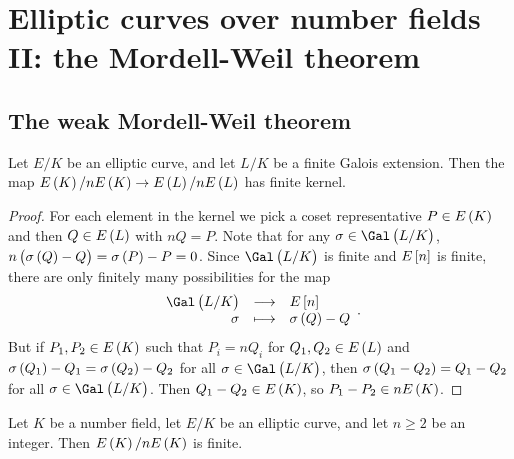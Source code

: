 \pagebreak

\section{Elliptic curves over number fields II: the Mordell-Weil theorem}

\subsection{The weak Mordell-Weil theorem}

\begin{lemma}
\label{lem:12.1}
Let $ E / K $ be an elliptic curve, and let $ L / K $ be a finite Galois extension. Then the map $ E\br{K} / nE\br{K} \to E\br{L} / nE\br{L} $ has finite kernel.
\end{lemma}

\begin{proof}
For each element in the kernel we pick a coset representative $ P \in E\br{K} $ and then $ Q \in E\br{L} $ with $ nQ = P $. Note that for any $ \sigma \in \Gal\br{L / K} $, $ n\br{\sigma\br{Q} - Q} = \sigma\br{P} - P = 0 $. Since $ \Gal\br{L / K} $ is finite and $ E\sbr{n} $ is finite, there are only finitely many possibilities for the map
$$ \function{\Gal\br{L / K}}{E\sbr{n}}{\sigma}{\sigma\br{Q} - Q}. $$
But if $ P_1, P_2 \in E\br{K} $ such that $ P_i = nQ_i $ for $ Q_1, Q_2 \in E\br{L} $ and $ \sigma\br{Q_1} - Q_1 = \sigma\br{Q_2} - Q_2 $ for all $ \sigma \in \Gal\br{L / K} $, then $ \sigma\br{Q_1 - Q_2} = Q_1 - Q_2 $ for all $ \sigma \in \Gal\br{L / K} $. Then $ Q_1 - Q_2 \in E\br{K} $, so $ P_1 - P_2 \in nE\br{K} $.
\end{proof}

\begin{theorem}
Let $ K $ be a number field, let $ E / K $ be an elliptic curve, and let $ n \ge 2 $ be an integer. Then $ E\br{K} / nE\br{K} $ is finite.
\end{theorem}

